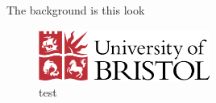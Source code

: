 The background is this look

\begin{figure}[t]
    \includegraphics[width=0.5\textwidth]{logos/bristol_uni.png}
    \caption{test}
\end{figure}